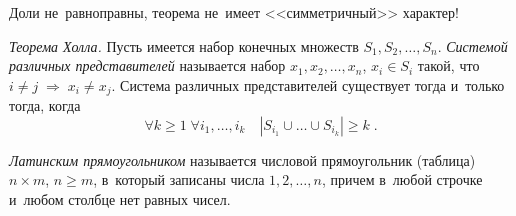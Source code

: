 \observation
Доли не~равноправны, теорема не~имеет <<симметричный>> характер!

\begin{problems}

\item\emph{Теорема Холла.}
Пусть имеется набор конечных множеств $S_1, S_2, \ldots, S_n$.
\emph{Системой различных представителей} называется набор
$x_1, x_2, \ldots, x_n$, $x_i \in S_i$ такой, что
\(
    i \neq j
\;\Rightarrow\;
    x_i \neq x_j
\).
Система различных представителей существует тогда и~только тогда, когда
\[
    \forall k \geq 1
\;
    \forall i_1, \ldots, i_k
\quad
    |S_{i_1} \cup \ldots \cup S_{i_k}| \geq k
\;.\]

\end{problems}

\emph{Латинским прямоугольником} называется числовой прямоугольник (таблица)
$n \times m$, $n \geq m$, в~который записаны числа $1, 2, \ldots, n$, причем
в~любой строчке и~любом столбце нет равных чисел.

